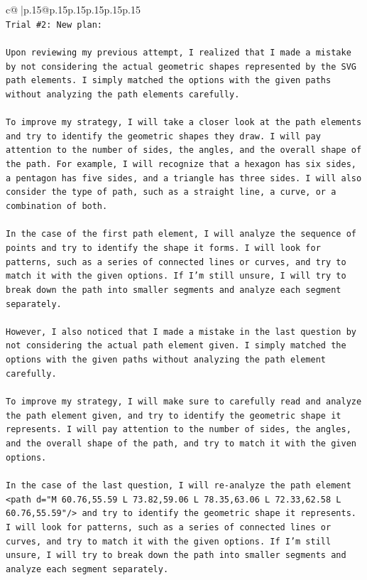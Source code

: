 \documentclass{article}
\begin{document}
{\begin{supertabular}{c@{$\;$}|p{.15\linewidth}@{}p{.15\linewidth}p{.15\linewidth}p{.15\linewidth}p{.15\linewidth}p{.15\linewidth}}
{{{\\ 
\texttt{Trial \#2: New plan: } \\
\\ 
\texttt{Upon reviewing my previous attempt, I realized that I made a mistake by not considering the actual geometric shapes represented by the SVG path elements. I simply matched the options with the given paths without analyzing the path elements carefully.} \\
\\ 
\texttt{To improve my strategy, I will take a closer look at the path elements and try to identify the geometric shapes they draw. I will pay attention to the number of sides, the angles, and the overall shape of the path. For example, I will recognize that a hexagon has six sides, a pentagon has five sides, and a triangle has three sides. I will also consider the type of path, such as a straight line, a curve, or a combination of both.} \\
\\ 
\texttt{In the case of the first path element, I will analyze the sequence of points and try to identify the shape it forms. I will look for patterns, such as a series of connected lines or curves, and try to match it with the given options. If I'm still unsure, I will try to break down the path into smaller segments and analyze each segment separately.} \\
\\ 
\texttt{However, I also noticed that I made a mistake in the last question by not considering the actual path element given. I simply matched the options with the given paths without analyzing the path element carefully. } \\
\\ 
\texttt{To improve my strategy, I will make sure to carefully read and analyze the path element given, and try to identify the geometric shape it represents. I will pay attention to the number of sides, the angles, and the overall shape of the path, and try to match it with the given options. } \\
\\ 
\texttt{In the case of the last question, I will re{-}analyze the path element <path d="M 60.76,55.59 L 73.82,59.06 L 78.35,63.06 L 72.33,62.58 L 60.76,55.59"/> and try to identify the geometric shape it represents. I will look for patterns, such as a series of connected lines or curves, and try to match it with the given options. If I'm still unsure, I will try to break down the path into smaller segments and analyze each segment separately.} \\
}}}
\end{supertabular}}
\end{document}

